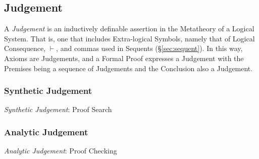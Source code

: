 \subsection{Judgement}\label{sec:judgement}

A \emph{Judgement} is an inductively definable assertion in the
Metatheory of a Logical System. That is, one that includes
Extra-logical Symbols, namely that of Logical Consequence, $\vdash$,
and commas used in Sequents (\S\ref{sec:sequent}). In this way, Axioms
are Judgements, and a Formal Proof expresses a Judgement with the
Premises being a sequence of Judgements and the Conclusion also a
Judgement.



\subsubsection{Synthetic Judgement}\label{sec:synthetic_judgement}

\emph{Synthetic Judgement}: Proof Search



\subsubsection{Analytic Judgement}\label{sec:analytic_judgement}

\emph{Analytic Judgement}: Proof Checking
